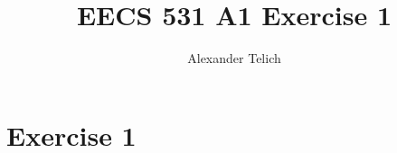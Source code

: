 \documentclass[11pt]{article}
\author{Alexander Telich}
\title{EECS 531 A1 Exercise 1}
\begin{document}
    \maketitle

    \section{Exercise 1}\label{sec:exercise1}
    
\end{document}
